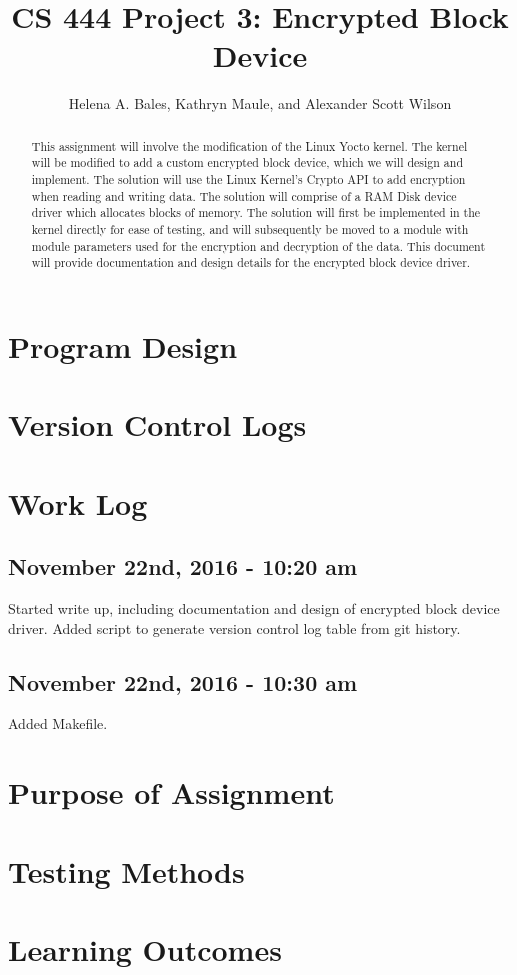 \documentclass[letterpaper,10pt]{article}
\title{CS 444 Project 3: Encrypted Block Device}
\author{Helena A. Bales, Kathryn Maule, and Alexander Scott Wilson }
\begin{document}
\maketitle

\begin{abstract}
This assignment will involve the modification of the Linux Yocto kernel. 
The kernel will be modified to add a custom encrypted block device, which we will design and implement. 
The solution will use the Linux Kernel's Crypto API to add encryption when reading and writing data. 
The solution will comprise of a RAM Disk device driver which allocates blocks of memory. 
The solution will first be implemented in the kernel directly for ease of testing, and will subsequently
 be moved to a module with module parameters used for the encryption and decryption of the data. 
This document will provide documentation and design details for the encrypted block device driver.
\end{abstract}

\clearpage

\tableofcontents

\clearpage

\section{Program Design}

\section{Version Control Logs}


\section{Work Log}
\subsection{November 22nd, 2016 - 10:20 am}
Started write up, including documentation and design of encrypted block device driver. 
Added script to generate version control log table from git history.

\subsection{November 22nd, 2016 - 10:30 am}
Added Makefile.

\section{Purpose of Assignment}
\section{Testing Methods}
\section{Learning Outcomes}
\end{document}
